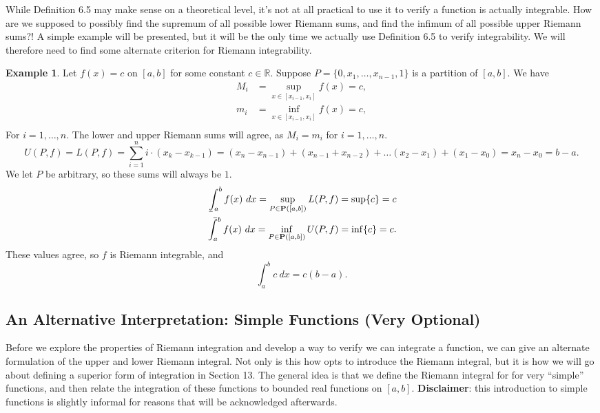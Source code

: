 \documentclass{article}
\def\upint{\mathchoice%
	{\mkern13mu\overline{\vphantom{\intop}\mkern7mu}\mkern-20mu}%
	{\mkern7mu\overline{\vphantom{\intop}\mkern7mu}\mkern-14mu}%
	{\mkern7mu\overline{\vphantom{\intop}\mkern7mu}\mkern-14mu}%
	{\mkern7mu\overline{\vphantom{\intop}\mkern7mu}\mkern-14mu}%
	\int}
\def\lowint{\mkern3mu\underline{\vphantom{\intop}\mkern7mu}\mkern-10mu\int}
\newcommand{\R}{\mathbb{R}}
\theoremstyle{definition}
\newtheorem{example}{Example}[section]
\begin{document}
	While Definition 6.5 may make sense on a theoretical level, it's not at all practical to use it to verify a function is actually integrable. How are we supposed to possibly find the supremum of all possible lower Riemann sums, and find the infimum of all possible upper Riemann sums?! A simple example will be presented, but it will be the only time we actually use Definition 6.5 to verify integrability. We will therefore need to find some alternate criterion for Riemann integrability.    
	\begin{example}
		Let $ f(x)=c $ on $ [a,b] $ for some constant $ c\in\R  $. Suppose $ P=\{0,x_1,\ldots,x_{n-1},1\} $ is a partition of $ [a,b] $. We have  \begin{align*}
			M_i&=\sup_{x\in[x_{i-1},x_i]} f(x)=c,\\
			m_i&=\inf_{x\in[x_{i-1},x_i]} f(x)=c,\\
		\end{align*} 
		For $ i=1,\ldots, n $. The lower and upper Riemann sums will agree, as $ M_i=m_i $ for $ i=1,\ldots, n $. $$ U(P,f)=L(P, f)=\sum_{i=1}^{n}i\cdot(x_k-x_{k-1})=(x_n-x_{n-1})+(x_{n-1}+x_{n-2})+\ldots (x_2-x_1)+(x_1-x_0)=x_n-x_0=b-a.$$ We let $ P $ be arbitrary, so these sums will always be $ 1 $.
		\begin{align*}
			\lowint_a^b f(x)\ dx=\sup\limits_{P\in\textbf{P}([a,b])} L(P,f)=\sup\{c\}=c\\ \upint_a^b f(x)\ dx =\inf\limits_{P\in\textbf{P}([a,b])} U(P,f)=\inf\{c\}=c.
		\end{align*}  
		These values agree, so $ f $ is Riemann integrable, and $$\int_{a}^{b} c\ dx=c(b-a) .$$
	\end{example}
	\subsection{An Alternative Interpretation: Simple Functions (Very Optional)}
	Before we explore the properties of Riemann integration and develop a way to verify we can integrate a function, we can give an alternate formulation of the upper and lower Riemann integral. Not only is this  how \cite{tao2006analysis} opts to introduce the Riemann integral, but it is how we will go about defining a superior form of integration in Section 13. The general idea is that we define the Riemann integral for for very ``simple'' functions, and then relate the integration of these functions to bounded real functions on $ [a,b] $. \textbf{Disclaimer}: this introduction to simple functions is slightly informal for reasons that will be acknowledged afterwards. 
	
\end{document}
